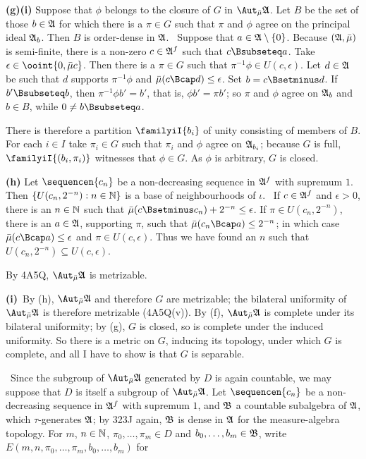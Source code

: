 {{\bf (g)(i)} Suppose that $\phi$ belongs to the closure of $G$ in $\AmuA$.
Let $B$ be the set of those $b\in\frak A$ for which there is a $\pi\in G$
such that $\pi$ and $\phi$ agree on the principal ideal $\frak A_b$.
Then $B$ is order-dense
in $\frak A$.   \Prf\ Suppose that $a\in\frak A\setminus\{0\}$.
Because $(\frak A,\bar\mu)$ is semi-finite, there is a non-zero
$c\in\frak A^f$ such that $c\Bsubseteq a$.   Take
$\epsilon\in\ooint{0,\bar\mu c}$.   Then there is a $\pi\in G$ such that
$\pi^{-1}\phi\in U(c,\epsilon)$.   Let $d\in\frak A$ be such that $d$
supports $\pi^{-1}\phi$ and $\bar\mu(c\Bcap d)\le\epsilon$.   Set
$b=c\Bsetminus d$.   If $b'\Bsubseteq b$, then
$\pi^{-1}\phi b'=b'$, that is, $\phi b'=\pi b'$;  so $\pi$ and $\phi$ agree
on $\frak A_b$ and $b\in B$, while $0\ne b\Bsubseteq a$.\ \Qed

\medskip

 There is therefore a partition $\familyiI{b_i}$ of unity
consisting of members of $B$.   For each $i\in I$ take $\pi_i\in G$ such
that $\pi_i$ and $\phi$ agree on $\frak A_{b_i}$;  because $G$ is full,
$\familyiI{(b_i,\pi_i)}$ witnesses that $\phi\in G$.   As $\phi$ is
arbitrary, $G$ is closed.

\medskip

{\bf (h)} Let $\sequencen{c_n}$ be a non-decreasing sequence in $\frak A^f$
with supremum $1$.   Then $\{U(c_n,2^{-n}):n\in\Bbb N\}$ is a base of
neighbourhoods of $\iota$.   \Prf\ If $c\in\frak A^f$
and $\epsilon>0$, there is an $n\in\Bbb N$ such that
$\bar\mu(c\Bsetminus c_n)+2^{-n}\le\epsilon$.   If $\pi\in U(c_n,2^{-n})$,
there is an $a\in\frak A$, supporting $\pi$, such that
$\bar\mu(c_n\Bcap a)\le 2^{-n}$;  in which case
$\bar\mu(c\Bcap a)\le\epsilon$ and $\pi\in U(c,\epsilon)$.   Thus we have
found an $n$ such that $U(c_n,2^{-n})\subseteq U(c,\epsilon)$.\ \Qed

By 4A5Q, $\AmuA$ is metrizable.

\medskip

{\bf (i)}\grheada\ By (h), $\AmuA$ and therefore $G$ are metrizable;  the
bilateral uniformity of $\AmuA$ is therefore metrizable (4A5Q(v)).
By (f), $\AmuA$ is complete under its bilateral uniformity;  by
(g), $G$ is closed, so is complete under the induced uniformity.   So
there is a metric on $G$, inducing its topology, under which $G$ is
complete, and all I have to show is that $G$ is separable.

\medskip

\quad\grheadb\ Since the subgroup of $\AmuA$ generated by $D$ is again
countable, we may suppose that $D$ is itself a subgroup of $\AmuA$.
Let $\sequencen{c_n}$ be a non-decreasing sequence in $\frak A^f$
with supremum $1$, and $\frak B$ a countable subalgebra of $\frak A$,
which $\tau$-generates $\frak A$;  by 323J again,
$\frak B$ is dense in $\frak A$ for the measure-algebra topology.   For
$m$, $n\in\Bbb N$, $\pi_0,\ldots,\pi_m\in D$ and
$b_0,\ldots,b_m\in\frak B$, write
$E(m,n,\pi_0,\ldots,\pi_m,b_0,\ldots,b_m)$ for

}
